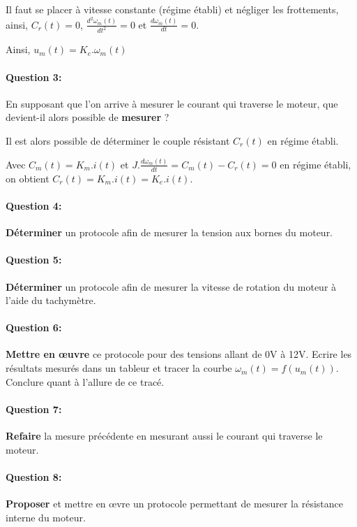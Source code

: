 Il faut se placer à vitesse constante (régime établi) et négliger les frottements, ainsi, $C_r(t)=0$, $\frac{d^2\omega_m(t)}{dt^2}=0$ et $\frac{d\omega_m(t)}{dt}=0$.

Ainsi, $u_m(t)=K_e.\omega_m(t)$

\paragraph{Question 3:} En supposant que l'on arrive à mesurer le courant qui traverse le moteur, que devient-il alors possible de \textbf{mesurer} ?

Il est alors possible de déterminer le couple résistant $C_r(t)$ en régime établi.

Avec $C_m(t)=K_m.i(t)$ et $J.\frac{d\omega_m(t)}{dt}=C_m(t)-C_r(t)=0$ en régime établi, on obtient $C_r(t)=K_m.i(t)=K_e.i(t)$.

\newpage


\paragraph{Question 4:} \textbf{Déterminer} un protocole afin de mesurer la tension aux bornes du moteur.

\paragraph{Question 5:} \textbf{Déterminer} un protocole afin de mesurer la vitesse de rotation du moteur à l'aide du tachymètre.

\paragraph{Question 6:} \textbf{Mettre en \oe uvre} ce protocole pour des tensions allant de 0V à 12V. Ecrire les résultats mesurés dans un tableur et tracer la courbe $\omega_m(t)=f(u_m(t))$. Conclure quant à l'allure de ce tracé.

\paragraph{Question 7:} \textbf{Refaire} la mesure précédente en mesurant aussi le courant qui traverse le moteur.

\paragraph{Question 8:} \textbf{Proposer} et mettre en \oe vre un protocole permettant de mesurer la résistance interne du moteur.

